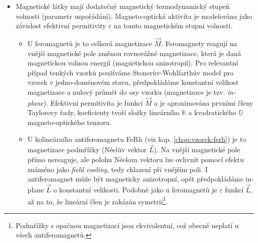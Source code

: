 \begin{itemize}
    \item 
        Magnetické látky mají dodatečný magnetický termodynamický stupeň volnosti (parametr uspořádání).
        Magneto-optická aktivita je modelována jako závislost efektivní permitivity $\varepsilon$ na tomto magnetickém stupni volnosti.
        \begin{itemize}
            \item 
                U feromagnetů je to celková magnetizace $\vec{M}$. 
                Feromagnety reagují na vnější magnetické pole změnou rovnovážné magnetizace, která je daná magnetickou volnou energií (magnetickou anizotropií).
                Pro relevantní případ tenkých vzorků používáme Stonerův-Wohlfarthův model\cite{stonerMechanismMagneticHysteresis1991} pro vzorek v jedno-doménovém stavu, předpokládáme konstantní velikost magnetizace a nulový průmět do osy vzorku (magnetizace je tzv. \emph{in-plane}).
                Efektivní permitivita je funkcí $\vec{M}$ a je aproximována prvními členy Taylorovy řady, koeficienty tvoří složky lineárního $\mathbb{K}$ a kvadratického $\mathbb{G}$ magneto-optického tenzoru\cite{visnovskyOpticsMagneticMultilayers2018}.
            \item
                U kolineárního antiferomagnetu FeRh\cite{saidlUltrarychlaLaserovaSpektroskopie2018} (viz kap. \ref{chap:vzorek-ferh}) je to magnetizace podmřížky (Néelův vektor $\vec{L}$).
                Na vnější magnetické pole přímo nereaguje, ale polohu Néelova vektoru lze ovlivnit pomocí efektu známéno jako \emph{field cooling}, tedy chlazení při vnějším poli.
                I antiferomagnet může být magneticky anizotropní, opět předpokládáme in-plane $\vec{L}$ o konstantní velikosti.
                Podobně jako u feromagnetů je $\varepsilon$ funkcí $\vec{L}$, až na to, že lineární člen je zakázán symetrií\footnote{Podmřížky s opačnou magnetizací jsou ekvivalentní, což obecně neplatí u všech antiferomagnetů.}.
        \end{itemize}
\end{itemize}
